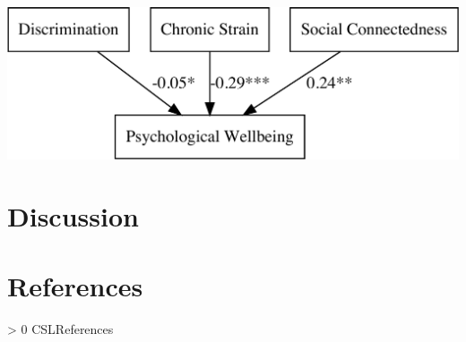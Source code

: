 \documentclass[
  english,
  man,floatsintext]{apa6}
\newlength{\cslhangindent}
\newenvironment{CSLReferences}[3] %
 {%
  \setlength{\parindent}{0pt}
  \ifodd #1 \everypar{\setlength{\hangindent}{\cslhangindent}}\ignorespaces\fi
  \ifnum #2 > 0
  \setlength{\parskip}{#2\baselineskip}
  \fi
 }%
 {}
\begin{document}
\includegraphics{prep_script_files/figure-latex/unnamed-chunk-1-1.pdf}

\hypertarget{discussion}{%
\section{Discussion}\label{discussion}}

\newpage

\hypertarget{references}{%
\section{References}\label{references}}

\begingroup
\setlength{\parindent}{-0.5in}
\setlength{\leftskip}{0.5in}

\hypertarget{refs}{}
\begin{CSLReferences}{0}{0}
\end{CSLReferences}

\endgroup


\printbibliography
\end{document}
